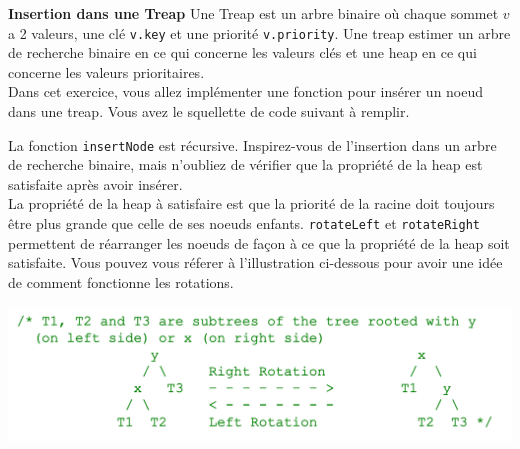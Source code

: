\begin{Exercice}[20 minutes]\textbf{Insertion dans une Treap}
    Une Treap est un arbre binaire où chaque sommet $v$ a 2 valeurs, une clé \lstinline{v.key} et une priorité \lstinline{v.priority}. Une treap estimer
    un arbre de recherche binaire en ce qui concerne les valeurs clés et une heap en ce qui concerne les valeurs prioritaires. \\

    Dans cet exercice, vous allez implémenter une fonction pour insérer un noeud dans une treap. Vous avez le squellette de code suivant à remplir.
    

    \begin{conseil}
        La fonction \lstinline{insertNode} est récursive. Inspirez-vous de l'insertion dans un arbre de recherche binaire, mais 
        n'oubliez de vérifier que la propriété de la heap est satisfaite après avoir insérer. \\
        La propriété de la heap à satisfaire est que la priorité de la racine doit toujours être plus grande que celle de ses noeuds enfants.
        \lstinline{rotateLeft} et \lstinline{rotateRight} permettent de réarranger les noeuds de façon à ce que la propriété
        de la heap soit satisfaite. Vous pouvez vous réferer à l'illustration ci-dessous pour avoir une idée de comment fonctionne les rotations.
    \end{conseil}

    \begin{center}
        \includegraphics[width=\linewidth]{treap_heap_property.png}
    \end{center}

    \begin{solution}
    
    \end{solution}
    \begin{solution}
        
    \end{solution}
    
\end{Exercice}



